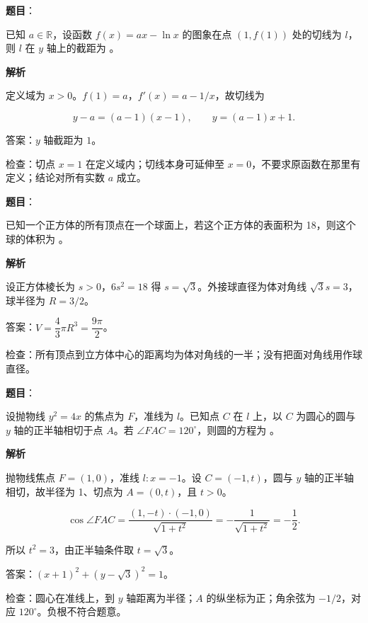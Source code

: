 \begin{answer}

\textbf{题目}：

已知 $a\in\mathbb R$，设函数 $f(x)=ax-\ln x$ 的图象在点 $(1,f(1))$ 处的切线为 $l$，则 $l$ 在 $y$ 轴上的截距为 \gkblank{}。

\textbf{解析}

定义域为 $x>0$。$f(1)=a$，$f'(x)=a-1/x$，故切线为

\nopagebreak[4]
\[y-a=(a-1)(x-1),\qquad y=(a-1)x+1.\]

答案：$y$ 轴截距为 $\boxed1$。

检查：切点 $x=1$ 在定义域内；切线本身可延伸至 $x=0$，不要求原函数在那里有定义；结论对所有实数 $a$ 成立。


\end{answer}
\begin{answer}

\textbf{题目}：

已知一个正方体的所有顶点在一个球面上，若这个正方体的表面积为 18，则这个球的体积为 \gkblank{}。

\textbf{解析}

设正方体棱长为 $s>0$，$6s^2=18$ 得 $s=\sqrt3$。外接球直径为体对角线 $\sqrt3s=3$，球半径为 $R=3/2$。

答案：$V=\dfrac43\pi R^3=\boxed{\dfrac{9\pi}{2}}$。

检查：所有顶点到立方体中心的距离均为体对角线的一半；没有把面对角线用作球直径。


\end{answer}
\begin{answer}

\textbf{题目}：

设抛物线 $y^2=4x$ 的焦点为 $F$，准线为 $l$。已知点 $C$ 在 $l$ 上，以 $C$ 为圆心的圆与 $y$ 轴的正半轴相切于点 $A$。若 $\angle FAC=120^\circ$，则圆的方程为 \gkblank{}。

\textbf{解析}

抛物线焦点 $F=(1,0)$，准线 $l:x=-1$。设 $C=(-1,t)$，圆与 $y$ 轴的正半轴相切，故半径为 1、切点为 $A=(0,t)$，且 $t>0$。

\nopagebreak[4]
\[\cos\angle FAC=\frac{(1,-t)\cdot(-1,0)}{\sqrt{1+t^2}}=-\frac1{\sqrt{1+t^2}}=-\frac12.\]

所以 $t^2=3$，由正半轴条件取 $t=\sqrt3$。

答案：$\boxed{(x+1)^2+(y-\sqrt3)^2=1}$。

检查：圆心在准线上，到 $y$ 轴距离为半径；$A$ 的纵坐标为正；角余弦为 $-1/2$，对应 $120^\circ$。负根不符合题意。


\end{answer}
